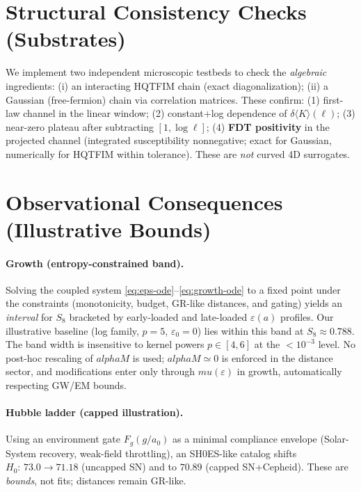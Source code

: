\documentclass[aps,prd,onecolumn,superscriptaddress,nofootinbib]{revtex4-2}
\def\mu{mu}%
\def\alpha{alpha}%
\def\alpha_M{alphaM}%
\begin{document}
\section{Structural Consistency Checks (Substrates)}
\label{sec:substrates}
We implement two independent microscopic testbeds to check the \emph{algebraic} ingredients: (i) an interacting HQTFIM chain (exact diagonalization); (ii) a Gaussian (free-fermion) chain via correlation matrices. These confirm: (1) first-law channel in the linear window; (2) constant+log dependence of \(\delta\!\langle K\rangle(\ell)\); (3) near-zero plateau after subtracting \([1,\log \ell]\); (4) \textbf{FDT positivity} in the projected channel (integrated susceptibility nonnegative; exact for Gaussian, numerically for HQTFIM within tolerance). These are \emph{not} curved 4D surrogates.

\section{Observational Consequences (Illustrative Bounds)}
\label{sec:obs}
\paragraph{Growth (entropy-constrained band).}
Solving the coupled system \eqref{eq:eps-ode}--\eqref{eq:growth-ode} to a fixed point under the constraints (monotonicity, budget, GR-like distances, and gating) yields an \emph{interval} for \(S_8\) bracketed by early-loaded and late-loaded \(\varepsilon(a)\) profiles. Our illustrative baseline (log family, \(p=5\), \(\varepsilon_0=0\)) lies within this band at \(S_8\approx 0.788\). The band width is insensitive to kernel powers \(p\in[4,6]\) at the \(<10^{-3}\) level. No post-hoc rescaling of \(\alpha_M\) is used; \(\alpha_M\simeq 0\) is enforced in the distance sector, and modifications enter only through \(\mu(\varepsilon)\) in growth, automatically respecting GW/EM bounds.

\paragraph{Hubble ladder (capped illustration).} Using an environment gate \(F_g(g/a_0)\) as a minimal compliance envelope (Solar-System recovery, weak-field throttling), an SH0ES-like catalog shifts \(H_0\!:\,73.0\to 71.18\) (uncapped SN) and to \(70.89\) (capped SN+Cepheid). These are \emph{bounds}, not fits; distances remain GR-like.
\end{document}
